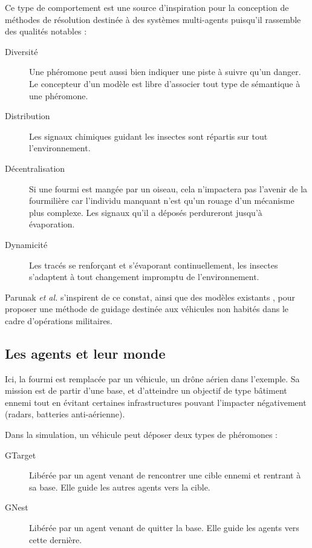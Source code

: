 \documentclass[12pt]{article}
\begin{document}
Ce type de comportement est une source d'inspiration pour la
conception de méthodes de résolution destinée à des systèmes
multi-agents puisqu'il rassemble des qualités notables \cite{parunak}
:

\begin{description}
\item[Diversité]{Une phéromone peut aussi bien indiquer une piste à
  suivre qu'un danger. Le concepteur d'un modèle est libre d'associer
  tout type de sémantique à une phéromone.}
\item[Distribution]{Les signaux chimiques guidant les insectes sont
  répartis sur tout l'environnement.}
\item[Décentralisation]{Si une fourmi est mangée par un oiseau, cela
  n'impactera pas l'avenir de la fourmilière car l'individu manquant
  n'est qu'un rouage d'un mécanisme plus complexe. Les signaux qu'il a
  déposés perdureront jusqu'à évaporation.}
\item[Dynamicité]{Les tracés se renforçant et s'évaporant
  continuellement, les insectes s'adaptent à tout changement impromptu
  de l'environnement.}
\end{description}

Parunak \textit{et al.} s'inspirent de ce constat, ainsi que des
modèles existants \cite{dorigo}, pour proposer une méthode de guidage
destinée aux véhicules non habités dans le cadre d'opérations
militaires.

\subsection{Les agents et leur monde}

Ici, la fourmi est remplacée par un véhicule, un drône aérien dans
l'exemple. Sa mission est de partir d'une base, et d'atteindre un
objectif de type bâtiment ennemi tout en évitant certaines
infrastructures pouvant l'impacter négativement (radars, batteries
anti-aérienne).

Dans la simulation, un véhicule peut déposer deux types de phéromones
:

\begin{description}
\item[GTarget]{Libérée par un agent venant de rencontrer une cible
  ennemi et rentrant à sa base. Elle guide les autres agents vers la
  cible.}
\item[GNest]{Libérée par un agent venant de quitter la base. Elle
  guide les agents vers cette dernière.}
\end{description}
\end{document}
